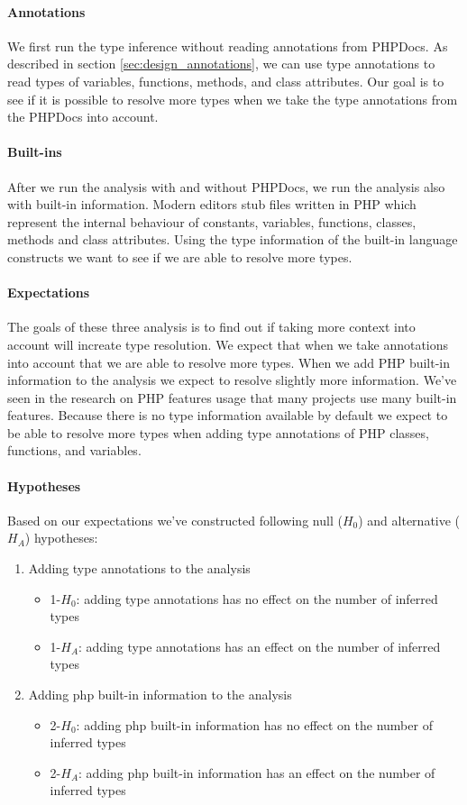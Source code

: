 \documentclass[../main.tex]{subfiles}
\begin{document}
	\paragraph{Annotations}
	We first run the type inference without reading annotations from PHPDocs.
	As described in section \ref{sec:design_annotations}, we can use type annotations to read types of variables, functions, methods, and class attributes.
	Our goal is to see if it is possible to resolve more types when we take the type annotations from the PHPDocs into account.
	
	\paragraph{Built-ins}
	After we run the analysis with and without PHPDocs, we run the analysis also with built-in information.
	Modern editors stub files written in PHP which represent the internal behaviour of constants, variables, functions, classes, methods and class attributes.
	Using the type information of the built-in language constructs we want to see if we are able to resolve more types.
	
	\paragraph{Expectations}
	The goals of these three analysis is to find out if taking more context into account will increate type resolution.
	We expect that when we take annotations into account that we are able to resolve more types.
	When we add PHP built-in information to the analysis we expect to resolve slightly more information.
	We've seen in the research on PHP features usage \cite{Hil:13} that many projects use many built-in features.
	Because there is no type information available by default we expect to be able to resolve more types when adding type annotations of PHP classes, functions, and variables.
	
	\paragraph{Hypotheses}
	Based on our expectations we've constructed following null ($H_0$) and alternative ($H_A$) hypotheses:
	\begin{enumerate}
		\item Adding type annotations to the analysis
		\begin{itemize}
			\item 1-$H_0$: adding type annotations has no effect on the number of inferred types
			\item 1-$H_A$: adding type annotations has an effect on the number of inferred types
		\end{itemize}		
		\item Adding php built-in information to the analysis 
		\begin{itemize}
			\item 2-$H_0$: adding php built-in information has no effect on the number of inferred types
			\item 2-$H_A$: adding php built-in information has an effect on the number of inferred types	
		\end{itemize}
	\end{enumerate}
\end{document}
